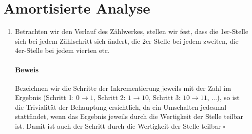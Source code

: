 \documentclass[a4paper,10pt]{article}
\begin{document}
\section{Amortisierte Analyse}
\begin{enumerate}
\item   Betrachten wir den Verlauf des Zählwerkes, stellen wir fest, dass die 1er-Stelle sich bei jedem Zählschritt sich 
        ändert, die 2er-Stelle bei jedem zweiten, die 4er-Stelle bei jedem vierten etc. 
        \paragraph*{Beweis} Bezeichnen wir die Schritte der Inkrementierung jeweils mit der Zahl im Ergebnis (Schritt 1: $0 \to 1$, Schritt 2: $1 \to 10$, Schritt 3: $10 \to 11$, ...), so ist die Trivialität der Behauptung ersichtlich, da ein Umschalten jedesmal stattfindet, wenn das Ergebnis jeweils durch die Wertigkeit der Stelle teilbar ist. Damit ist auch der Schritt durch die Wertigkeit der Stelle teilbar \hfill $\square$
        

\end{enumerate}
\end{document}
